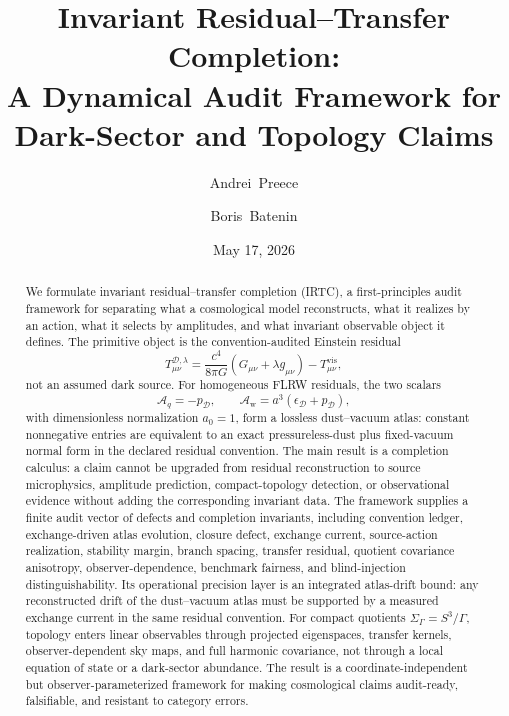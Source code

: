 \documentclass[
  aps,
  prd,
  reprint,
  superscriptaddress,
  floatfix,
  nofootinbib,
  longbibliography
]{revtex4-2}
\theoremstyle{plain}
\theoremstyle{definition}
\theoremstyle{remark}
\newcommand{\D}{\mathcal D}
\newcommand{\vis}{\mathrm{vis}}
\newcommand{\Aq}{\mathcal A_q}
\newcommand{\Aw}{\mathcal A_{\mathrm w}}
\begin{document}
\raggedbottom

\title{\texorpdfstring{Invariant Residual--Transfer Completion:\\
A Dynamical Audit Framework for Dark-Sector and Topology Claims}{Invariant Residual--Transfer Completion: A Dynamical Audit Framework for Dark-Sector and Topology Claims}}

\author{Andrei~Preece}

\author{Boris~Batenin}

\date{May 17, 2026}

\begin{abstract}
We formulate invariant residual--transfer completion (IRTC), a first-principles audit framework for separating what a cosmological model reconstructs, what it realizes by an action, what it selects by amplitudes, and what invariant observable object it defines.  The primitive object is the convention-audited Einstein residual
\begin{equation*}
T^{\D,\lambda}_{\mu\nu}=
\frac{c^4}{8\pi G}(G_{\mu\nu}+\lambda g_{\mu\nu})-T^{\vis}_{\mu\nu},
\end{equation*}
not an assumed dark source.  For homogeneous FLRW residuals, the two scalars
\begin{equation*}
\Aq=-p_\D,\qquad
\Aw=a^3(\epsilon_\D+p_\D),
\end{equation*}
with dimensionless normalization $a_0=1$, form a lossless dust--vacuum atlas: constant nonnegative entries are equivalent to an exact pressureless-dust plus fixed-vacuum normal form in the declared residual convention.  The main result is a completion calculus: a claim cannot be upgraded from residual reconstruction to source microphysics, amplitude prediction, compact-topology detection, or observational evidence without adding the corresponding invariant data.  The framework supplies a finite audit vector of defects and completion invariants, including convention ledger, exchange-driven atlas evolution, closure defect, exchange current, source-action realization, stability margin, branch spacing, transfer residual, quotient covariance anisotropy, observer-dependence, benchmark fairness, and blind-injection distinguishability.  Its operational precision layer is an integrated atlas-drift bound: any reconstructed drift of the dust--vacuum atlas must be supported by a measured exchange current in the same residual convention.  For compact quotients $\Sigma_\Gamma=S^3/\Gamma$, topology enters linear observables through projected eigenspaces, transfer kernels, observer-dependent sky maps, and full harmonic covariance, not through a local equation of state or a dark-sector abundance.  The result is a coordinate-independent but observer-parameterized framework for making cosmological claims audit-ready, falsifiable, and resistant to category errors.
\end{abstract}
\end{document}
